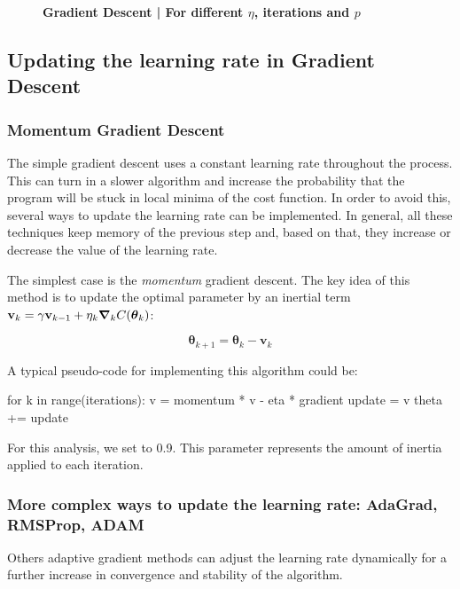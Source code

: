 \documentclass[11pt,a4paper,twocolumn]{article}
\let\oldtexttt\texttt
\renewcommand{\texttt}[1]{\tcbox{\oldtexttt{#1}}}
\begin{document}
\begin{figure*}
	\centering
	\texttt{[image: MSE\_R2\_GD\_eta1]}
	\caption{\textbf{Gradient Descent | For different $\eta$, iterations and $p$}}
	\label{fig:mse_r2_iteretap}
\end{figure*}

\subsection{Updating the learning rate in Gradient Descent}

\subsubsection{Momentum Gradient Descent}
The simple gradient descent uses a constant learning rate throughout the process. This can turn in a slower algorithm and increase the probability that the program will be stuck in local minima of the cost function. In order to avoid this, several ways to update the learning rate can be implemented. In general, all these techniques keep memory of the previous step and, based on that, they increase or decrease the value of the learning rate.

The simplest case is the \emph{momentum} gradient descent. The key idea of this method is to update the optimal parameter by an inertial term $\mathbf{v}_{k}=\gamma \mathbf{v}_{k-1}+\eta_{k}\grad_k C(\boldsymbol{\theta}_k)$:

\begin{equation}
	\boldsymbol{\theta}_{k+1}= \boldsymbol{\theta}_k -\mathbf{v}_{k}
\end{equation}

A typical pseudo-code for implementing this algorithm could be:

\begin{python}
	for k in range(iterations):
		v = momentum * v - eta * gradient
		update = v
		theta += update
\end{python}

For this analysis, we set \texttt{momentum} to 0.9. This parameter represents the amount of inertia applied to each iteration.

\subsubsection{More complex ways to update the learning rate: AdaGrad, RMSProp, ADAM}

Others adaptive gradient methods can adjust the learning rate dynamically for a further increase in convergence and stability of the algorithm.
\end{document}
